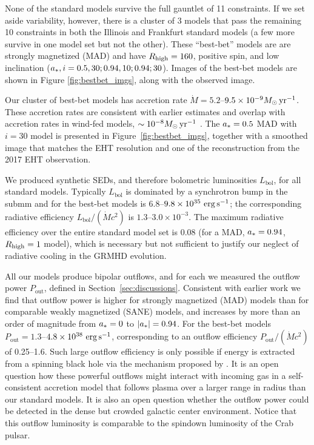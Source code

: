 None of the standard models survive the full gauntlet of 11 constraints.
If we set aside variability, however, there is a cluster of 3 models that pass the remaining 10 constraints in both the Illinois and Frankfurt standard models (a few more survive in one model set but not the other).  These ``best-bet'' models are are strongly magnetized (MAD) and have $R_\mathrm{high} = 160$, positive spin, and low inclination ($a_*, i = 0.5, 30; 0.94, 10; 0.94; 30$).  Images of the best-bet models are shown in Figure \ref{fig:bestbet_imgs}, along with the observed image.


Our cluster of best-bet models has accretion rate $\dot{M} = 5.2$--$9.5 \times 10^{-9}M_\odot\,\mathrm{yr}^{-1}$.
These accretion rates are consistent with earlier estimates and overlap with accretion rates in wind-fed models, $\sim 10^{-8} M_\odot\,\mathrm{yr}^{-1}$ \citep{2020ApJ...896L...6R}.
The $a_* = 0.5$ MAD with $i=30$ model is presented in Figure~\ref{fig:bestbet_imgs}, together with a smoothed image that matches the EHT resolution and one of the reconstruction from the 2017 EHT observation.

We produced synthetic SEDs, and therefore bolometric luminosities $L_\mathrm{bol}$, for all standard models.  Typically $L_\mathrm{bol}$ is dominated by a synchrotron bump in the submm and for the best-bet models is $6.8$--$9.8\times10^{35}\,\,\mathrm{erg}\,\mathrm{s}^{-1}$; the corresponding radiative efficiency $L_\mathrm{bol}/(\dot{M} c^2)$ is $1.3$--$3.0\times 10^{-3}$.  The maximum radiative efficiency over the entire standard model set is 0.08 (for a MAD, $a_* = 0.94$, $R_\mathrm{high} = 1$ model), which is necessary but not sufficient to justify our neglect of radiative cooling in the GRMHD evolution.

All our models produce bipolar outflows, and for each we measured the outflow power $P_\mathrm{out}$, defined in Section~\ref{sec:discussions}. Consistent with earlier work we find that outflow power is higher for strongly magnetized (MAD) models than for comparable weakly magnetized (SANE) models, and increases by more than an order of magnitude from $a_* = 0$ to $|a_*| = 0.94$.  For the best-bet models $P_\mathrm{out} = 1.3$--$4.8 \times 10^{38}\,\,\mathrm{erg}\,\mathrm{s}^{-1}$, corresponding to an outflow efficiency $P_\mathrm{out} /(\dot{M} c^2)$ of 0.25--1.6.  Such large  outflow efficiency is only possible if energy is extracted from a spinning black hole via the mechanism proposed by  \cite{1977MNRAS.179..433B}.  It is an open question how these powerful outflows might interact with incoming gas in a self-consistent accretion model that follows plasma over a larger range in radius than our standard models.  It is also an open question whether the outflow power could be detected in the dense but crowded galactic center environment.  Notice that this outflow luminosity is comparable to the spindown luminosity of the Crab pulsar.

